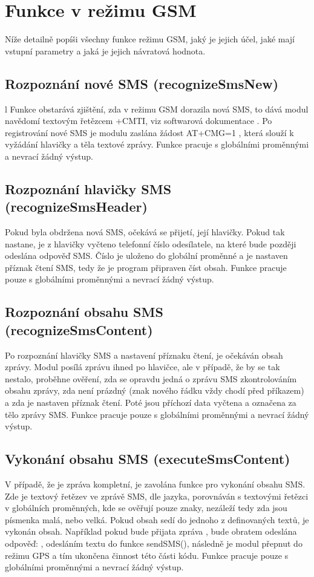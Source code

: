 \documentclass[FM,BP]{tulthesis}  %
\begin{document}

\section{Funkce v režimu GSM}
Níže detailně popíši všechny funkce režimu GSM, jaký je jejich účel, jaké mají vstupní parametry a jaká je jejich návratová hodnota.

\subsection{Rozpoznání nové SMS (recognizeSmsNew)}l
Funkce obstarává zjištění, zda v režimu GSM dorazila nová SMS, to dává modul navědomí textovým řetězcem +CMTI, viz softwarová dokumentace \cite{SIMCOM SW}. Po registrování nové SMS je modulu zaslána žádost AT+CMG=1 \cite{SIMCOM SW}, která slouží k vyžádání hlavičky a těla textové zprávy. Funkce pracuje s globálními proměnnými a nevrací žádný výstup.

\subsection{Rozpoznání hlavičky SMS (recognizeSmsHeader)}
Pokud byla obdržena nová SMS, očekává se přijetí, její hlavičky. Pokud tak nastane, je z hlavičky vyčteno telefonní číslo odesílatele, na které bude později odeslána odpověď SMS. Číslo je uloženo do globální proměnné a je nastaven příznak čtení SMS, tedy že je program připraven číst obsah. Funkce pracuje pouze s globálními proměnnými a nevrací žádný výstup.

\subsection{Rozpoznání obsahu SMS (recognizeSmsContent)}
Po rozpoznání hlavičky SMS a nastavení příznaku čtení, je očekáván obsah zprávy. Modul posílá zprávu ihned po hlavičce, ale v případě, že by se tak nestalo, proběhne ověření, zda se opravdu jedná o zprávu SMS zkontrolováním obsahu zprávy, zda není prázdný (znak nového řádku vždy chodí před příkazem) a zda je nastaven příznak čtení. Poté jsou příchozí data vyčtena a označena za tělo zprávy SMS. Funkce pracuje pouze s globálními proměnnými a nevrací žádný výstup.

\subsection{Vykonání obsahu SMS (executeSmsContent)}
V případě, že je zpráva kompletní, je zavolána funkce pro vykonání obsahu SMS. Zde je textový řetězev ve zprávě SMS, dle jazyka, porovnáván s textovými řetězci v globálních proměnných, kde se ověřují pouze znaky, nezáleží tedy zda jsou písmenka malá, nebo velká. Pokud obsah sedí do jednoho z definovaných textů, je vykonán obsah. Například pokud bude přijata zpráva , bude obratem odeslána odpověď: , odesláním textu do funkce sendSMS(), následně je modul přepnut do režimu GPS a tím ukončena činnost této části kódu. Funkce pracuje pouze s globálními proměnnými a nevrací žádný výstup.
\end{document}
